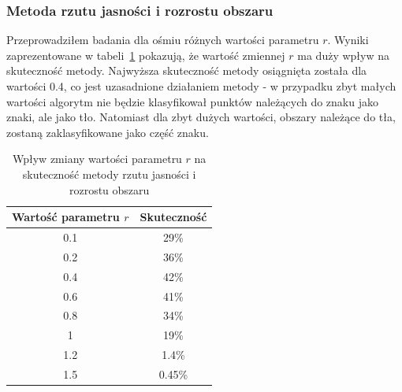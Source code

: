 \subsubsection{Metoda rzutu jasności i rozrostu obszaru}
Przeprowadziłem badania dla ośmiu różnych wartości parametru $r$. Wyniki zaprezentowane w tabeli~\ref{tab:rzut_jasnosci_rozrost_obszaru} pokazują, że wartość zmiennej $r$ ma duży wpływ na skuteczność metody. Najwyższa skuteczność metody osiągnięta została dla wartości 0.4, co jest uzasadnione działaniem metody - w przypadku zbyt małych wartości algorytm nie będzie klasyfikował punktów należących do znaku jako znaki, ale jako tło. Natomiast dla zbyt dużych wartości, obszary należące do tła, zostaną zaklasyfikowane jako część znaku. 
\begin {table}
  \begin{center}
    \begin{tabular}{c | c}
      Wartość parametru $r$ & Skuteczność \\
      \hline
      0.1 & 29\% \\
      0.2 & 36\% \\
      0.4 & 42\% \\
      0.6 & 41\% \\
      0.8 & 34\% \\
      1 & 19\% \\
      1.2 & 1.4\%\\
      1.5 & 0.45\%
    \end{tabular}
    \caption {Wpływ zmiany wartości parametru $r$ na skuteczność metody rzutu jasności i rozrostu obszaru}
    \label{tab:rzut_jasnosci_rozrost_obszaru} 
  \end{center}
\end {table}

